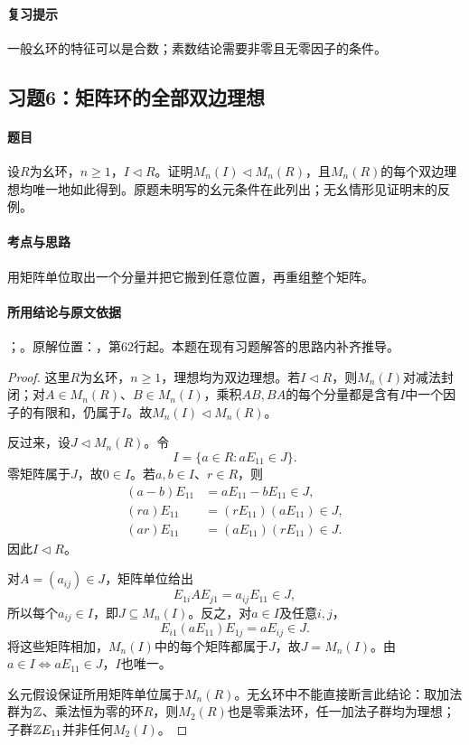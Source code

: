 \paragraph{复习提示}

一般幺环的特征可以是合数；素数结论需要非零且无零因子的条件。



\subsection{习题6：矩阵环的全部双边理想}

\label{ex:3:6}

\paragraph{题目}

设$R$为幺环，$n\ge1$，$I\lhd R$。证明$M_n(I)\lhd M_n(R)$，且$M_n(R)$的每个双边理想均唯一地如此得到。原题未明写的幺元条件在此列出；无幺情形见证明末的反例。

\paragraph{考点与思路}

用矩阵单位取出一个分量并把它搬到任意位置，再重组整个矩阵。

\paragraph{所用结论与原文依据}

；。原解位置：，第62行起。本题在现有习题解答的思路内补齐推导。


\begin{proof}

这里$R$为幺环，$n\ge1$，理想均为双边理想。若$I\lhd R$，则$M_n(I)$对减法封闭；对$A\in M_n(R)$、$B\in M_n(I)$，乘积$AB,BA$的每个分量都是含有$I$中一个因子的有限和，仍属于$I$。故$M_n(I)\lhd M_n(R)$。

反过来，设$J\lhd M_n(R)$。令
\[
I=\{a\in R:aE_{11}\in J\}.
\]
零矩阵属于$J$，故$0\in I$。若$a,b\in I$、$r\in R$，则
\begin{align*}
(a-b)E_{11}&=aE_{11}-bE_{11}\in J,\\
(ra)E_{11}&=(rE_{11})(aE_{11})\in J,\\
(ar)E_{11}&=(aE_{11})(rE_{11})\in J.
\end{align*}
因此$I\lhd R$。

对$A=(a_{ij})\in J$，矩阵单位给出
\[
E_{1i}AE_{j1}=a_{ij}E_{11}\in J,
\]
所以每个$a_{ij}\in I$，即$J\subseteq M_n(I)$。反之，对$a\in I$及任意$i,j$，
\[
E_{i1}(aE_{11})E_{1j}=aE_{ij}\in J.
\]
将这些矩阵相加，$M_n(I)$中的每个矩阵都属于$J$，故$J=M_n(I)$。由$a\in I\Longleftrightarrow aE_{11}\in J$，$I$也唯一。

幺元假设保证所用矩阵单位属于$M_n(R)$。无幺环中不能直接断言此结论：取加法群为$\mathbb Z$、乘法恒为零的环$R$，则$M_2(R)$也是零乘法环，任一加法子群均为理想；子群$\mathbb Z E_{11}$并非任何$M_2(I)$。

\end{proof}


